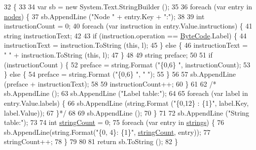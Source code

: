 \begin{DoxyCode}
32                                           \{
33 
34             var sb = \textcolor{keyword}{new} System.Text.StringBuilder ();
35 
36             \textcolor{keywordflow}{foreach} (var entry \textcolor{keywordflow}{in} \hyperlink{a00081_a3f4928a577c88263ad016be259b175c4}{nodes}) \{
37                 sb.AppendLine (\textcolor{stringliteral}{"Node "} + entry.Key + \textcolor{stringliteral}{":"});
38 
39                 \textcolor{keywordtype}{int} instructionCount = 0;
40                 \textcolor{keywordflow}{foreach} (var instruction \textcolor{keywordflow}{in} entry.Value.instructions) \{
41                     \textcolor{keywordtype}{string} instructionText;
42 
43                     \textcolor{keywordflow}{if} (instruction.operation == \hyperlink{a00040_ad5dfb6ee68ca7469623ad3e459f98894}{ByteCode}.Label) \{
44                         instructionText = instruction.ToString (\textcolor{keyword}{this}, l);
45                     \} \textcolor{keywordflow}{else} \{
46                         instructionText = \textcolor{stringliteral}{"    "} + instruction.ToString (\textcolor{keyword}{this}, l);
47                     \}
48 
49                     \textcolor{keywordtype}{string} preface;
50 
51                     \textcolor{keywordflow}{if} (instructionCount %
      ) \{
52                         preface = string.Format (\textcolor{stringliteral}{"\{0,6\}   "}, instructionCount);
53                     \} \textcolor{keywordflow}{else} \{
54                         preface = string.Format (\textcolor{stringliteral}{"\{0,6\}   "}, \textcolor{stringliteral}{" "});
55                     \}
56 
57                     sb.AppendLine (preface + instructionText);
58 
59                     instructionCount++;
60                 \}
61 
62                 \textcolor{comment}{/* sb.AppendLine ();}
63 \textcolor{comment}{                sb.AppendLine ("Label table:");}
64 \textcolor{comment}{}
65 \textcolor{comment}{                foreach (var label in entry.Value.labels) \{}
66 \textcolor{comment}{                    sb.AppendLine (string.Format ("\{0,12\} : \{1\}", label.Key, label.Value));}
67 \textcolor{comment}{                \}*/}
68 
69                 sb.AppendLine ();
70             \}
71 
72             sb.AppendLine (\textcolor{stringliteral}{"String table:"});
73 
74             \textcolor{keywordtype}{int} \hyperlink{a00081_a8ef1d10094ef00311aade6715ba78ec7}{stringCount} = 0;
75             \textcolor{keywordflow}{foreach} (var entry \textcolor{keywordflow}{in} \hyperlink{a00081_a91518fda7e41bf573f66c6946dd3b4cb}{strings}) \{
76                 sb.AppendLine(string.Format(\textcolor{stringliteral}{"\{0, 4\}: \{1\}"}, \hyperlink{a00081_a8ef1d10094ef00311aade6715ba78ec7}{stringCount}, entry));
77                 stringCount++;
78             \}
79 
80 
81             \textcolor{keywordflow}{return} sb.ToString ();
82         \}
\end{DoxyCode}
